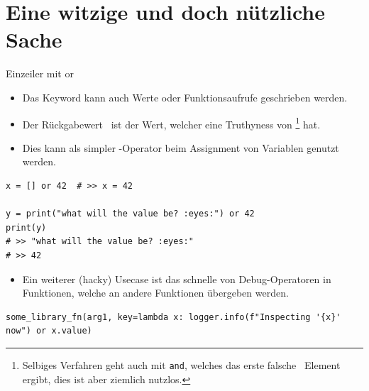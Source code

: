 \documentclass[12pt, aspectratio=169, usepdftitle=false]{beamer}
\newcommand{\pp}[1]{\lpl{#1}}
\begin{document}
\framecardfragen

\section{Eine witzige und doch nützliche Sache}
\begin{frame}[fragile]{Einzeiler mit \glqq or\grqq}
	\begin{itemize}
		\item Das Keyword \pp{or} kann auch  Werte oder Funktionsaufrufe geschrieben werden.
		
		\pause
		
		\item Der \glqq Rückgabewert\grqq~ ist der  Wert, welcher eine Truthyness von \pp{True}\footnote{Selbiges Verfahren geht auch mit \texttt{and}, welches das erste \glqq falsche\grqq~ Element ergibt, dies ist aber ziemlich nutzlos.} hat.
		
		\pause
		
		\item Dies kann als simpler -Operator beim Assignment von Variablen genutzt werden.
	\end{itemize}
	\begin{lstlisting}[language=pytiny]
x = [] or 42  # >> x = 42

y = print("what will the value be? :eyes:") or 42
print(y)
# >> "what will the value be? :eyes:"
# >> 42
	\end{lstlisting}
	
	\pause
	
	\begin{itemize}
		\item Ein weiterer (hacky) Usecase ist das schnelle  von Debug-Operatoren in Funktionen, welche an andere Funktionen übergeben werden.
	\end{itemize}
	\begin{lstlisting}[language=pytiny]
some_library_fn(arg1, key=lambda x: logger.info(f"Inspecting '{x}' now") or x.value)
	\end{lstlisting}
\end{frame}


\framecardfragen
\end{document}
